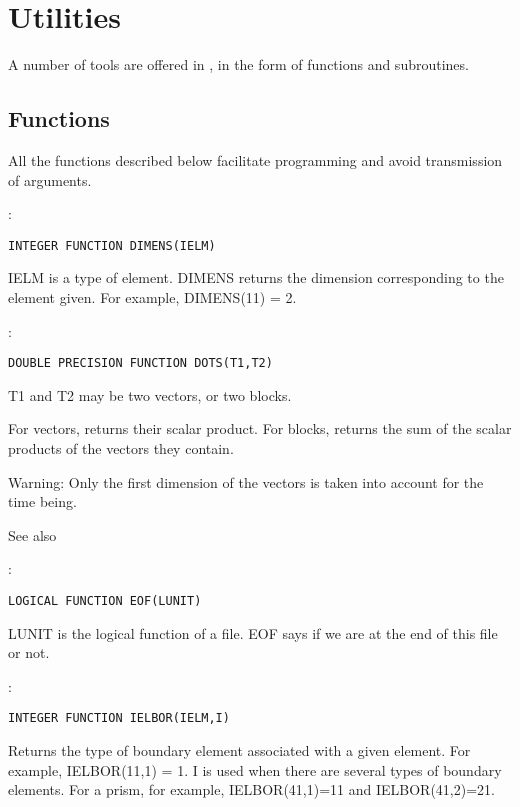 \section{Utilities}

A number of tools are offered in \bief, in the form of functions and subroutines.

\subsection{Functions}

All the functions described below facilitate programming and avoid transmission of arguments.

:
\begin{lstlisting}[language=TelFortran]
INTEGER FUNCTION DIMENS(IELM)
\end{lstlisting}

IELM is a type of element. DIMENS returns the dimension corresponding to the
element given. For example, DIMENS(11) = 2.

:
\begin{lstlisting}[language=TelFortran]
DOUBLE PRECISION FUNCTION DOTS(T1,T2)
\end{lstlisting}

T1 and T2 may be two vectors, or two blocks.

For vectors, returns their scalar product. For blocks, returns the sum of the
scalar products of the vectors they contain.

\begin{WarningBlock}{Warning:}
Only the first dimension of the vectors is taken into account for the time being.
\end{WarningBlock}

See also 

:
\begin{lstlisting}[language=TelFortran]
LOGICAL FUNCTION EOF(LUNIT)
\end{lstlisting}

LUNIT is the logical function of a file. EOF says if we are at the end of this
file or not.

:
\begin{lstlisting}[language=TelFortran]
INTEGER FUNCTION IELBOR(IELM,I)
\end{lstlisting}

Returns the type of boundary element associated with a given element. For
example, IELBOR(11,1) = 1. I is used when there are several types of boundary
elements. For a prism, for example, IELBOR(41,1)=11 and IELBOR(41,2)=21.

